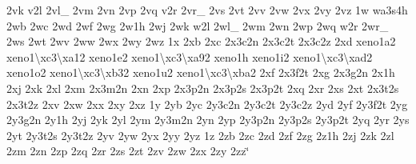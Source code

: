 \begin{DoxyCompactItemize}
2vk v2l 2vl\-\_\- 2vm 2vn 2vp 2vq v2r 2vr\-\_\- 2vs 2vt 2vv 2vw 2vx 2vy 2vz 1w wa3s4h 2wb 2wc 2wd 2wf 2wg 2w1h 2wj 2wk w2l 2wl\-\_\- 2wm 2wn 2wp 2wq w2r 2wr\-\_\- 2ws 2wt 2wv 2ww 2wx 2wy 2wz 1x 2xb 2xc 2x3c2n 2x3c2t 2x3c2z 2xd xeno1a2 xeno1\textbackslash{}xc3\textbackslash{}xa12 xeno1e2 xeno1\textbackslash{}xc3\textbackslash{}xa92 xeno1h xeno1i2 xeno1\textbackslash{}xc3\textbackslash{}xad2 xeno1o2 xeno1\textbackslash{}xc3\textbackslash{}xb32 xeno1u2 xeno1\textbackslash{}xc3\textbackslash{}xba2 2xf 2x3f2t 2xg 2x3g2n 2x1h 2xj 2xk 2xl 2xm 2x3m2n 2xn 2xp 2x3p2n 2x3p2s 2x3p2t 2xq 2xr 2xs 2xt 2x3t2s 2x3t2z 2xv 2xw 2xx 2xy 2xz 1y 2yb 2yc 2y3c2n 2y3c2t 2y3c2z 2yd 2yf 2y3f2t 2yg 2y3g2n 2y1h 2yj 2yk 2yl 2ym 2y3m2n 2yn 2yp 2y3p2n 2y3p2s 2y3p2t 2yq 2yr 2ys 2yt 2y3t2s 2y3t2z 2yv 2yw 2yx 2yy 2yz 1z 2zb 2zc 2zd 2zf 2zg 2z1h 2zj 2zk 2zl 2zm 2zn 2zp 2zq 2zr 2zs 2zt 2zv 2zw 2zx 2zy 2zz\char`\"{}
\end{DoxyCompactItemize}


